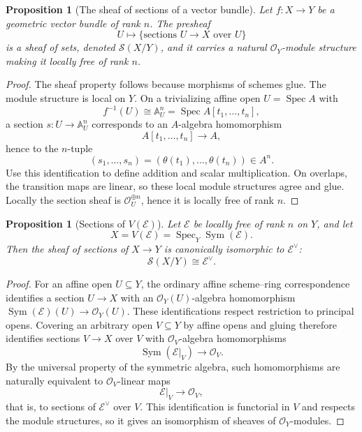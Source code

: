 \documentclass[11pt]{amsart}
\DeclareMathOperator{\Spec}{Spec}
\DeclareMathOperator{\Sym}{Sym}
\newcommand{\OO}{\mathcal O}
\newcommand{\E}{\mathscr E}
\theoremstyle{plain}
\newtheorem{proposition}[theorem]{Proposition}
\theoremstyle{definition}
\theoremstyle{remark}
\begin{document}
\begin{proposition}[The sheaf of sections of a vector bundle]\label{prop:sections-sheaf}
Let $f:X\to Y$ be a geometric vector bundle of rank $n$.  The presheaf
\[
  U\longmapsto \{\text{sections } U\to X \text{ over } U\}
\]
is a sheaf of sets, denoted $\mathscr S(X/Y)$, and it carries a natural $\OO_Y$-module structure making it locally free of rank $n$.
\end{proposition}

\begin{proof}
The sheaf property follows because morphisms of schemes glue.  The module structure is local on $Y$.  On a trivializing affine open $U=\Spec A$ with
\[
  f^{-1}(U)\cong \mathbb A^n_U=\Spec A[t_1,\ldots,t_n],
\]
a section $s:U\to \mathbb A^n_U$ corresponds to an $A$-algebra homomorphism
\[
  A[t_1,\ldots,t_n]\longrightarrow A,
\]
hence to the $n$-tuple
\[
  (s_1,\ldots,s_n)=(\theta(t_1),\ldots,\theta(t_n))\in A^n.
\]
Use this identification to define addition and scalar multiplication.  On overlaps, the transition maps are linear, so these local module structures agree and glue.  Locally the section sheaf is $\OO_U^{\oplus n}$, hence it is locally free of rank $n$.
\end{proof}

\begin{proposition}[Sections of $V(\E)$]\label{prop:sections-of-ve}
Let $\E$ be locally free of rank $n$ on $Y$, and let
\[
  X=V(\E)=\Spec_Y\Sym(\E).
\]
Then the sheaf of sections of $X\to Y$ is canonically isomorphic to $\E^\vee$:
\[
  \mathscr S(X/Y)\cong \E^\vee.
\]
\end{proposition}

\begin{proof}
For an affine open $U\subseteq Y$, the ordinary affine scheme--ring correspondence identifies a section $U\to X$ with an $\OO_Y(U)$-algebra homomorphism $\Sym(\E)(U)\to\OO_Y(U)$. These identifications respect restriction to principal opens. Covering an arbitrary open $V\subseteq Y$ by affine opens and gluing therefore identifies sections $V\to X$ over $V$ with $\OO_V$-algebra homomorphisms
\[
  \Sym(\E|_V)\longrightarrow \OO_V.
\]
By the universal property of the symmetric algebra, such homomorphisms are naturally equivalent to $\OO_V$-linear maps
\[
  \E|_V\longrightarrow \OO_V,
\]
that is, to sections of $\E^\vee$ over $V$.  This identification is functorial in $V$ and respects the module structures, so it gives an isomorphism of sheaves of $\OO_Y$-modules.
\end{proof}
\end{document}
